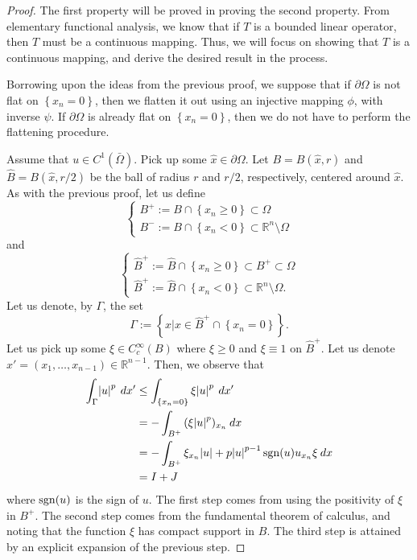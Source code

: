 \documentclass[10pt]{article}
\begin{document}
\begin{proof}
	The first property will be proved in proving the second property. From elementary functional analysis, we know that if $T$ is a bounded linear operator, then $T$ must be a continuous mapping. Thus, we will focus on showing that $T$ is a continuous mapping, and derive the desired result in the process. 
	
	Borrowing upon the ideas from the previous proof, we suppose that if $\partial \Omega$ is not flat on $\left\{ x_{n} = 0 \right\}$, then we flatten it out using an injective mapping $\phi$, with inverse $\psi$. If $\partial \Omega$ is already flat on $\left\{x_n = 0\right\}$, then we do not have to perform the flattening procedure.
	
	Assume that $u \in C^1(\bar{\Omega})$. Pick up some $\hat{x} \in \partial \Omega$. Let $B = B(\hat{x}, r)$ and $\widehat{B} = B(\hat{x},r/2)$ be the ball of radius $r$ and $r/2$, respectively, centered around $\hat{x}$. As with the previous proof, let us define 
	\begin{equation*}
		\displaystyle \begin{cases}
			B^+ := B \cap \left\{ x_n \geq 0 \right\} \subset \Omega \\
			B^- := B \cap \left\{ x_n < 0 \right\} \subset \mathbb{R}^n \setminus \Omega
		\end{cases}
	\end{equation*}
	and
	\begin{equation*}
		\displaystyle \begin{cases}
			\widehat{B}^+ := \widehat{B} \cap \left\{ x_n \geq 0 \right\} \subset B^+ \subset \Omega \\
			\widehat{B}^+ := \widehat{B} \cap \left\{ x_n < 0 \right\} \subset \mathbb{R}^n \setminus \Omega.
		\end{cases}
	\end{equation*}
	Let us denote, by $\Gamma$, the set 
	\begin{equation*}
		\displaystyle \Gamma := \left\{ x | x \in \widehat{B}^+ \cap \left\{x_n = 0\right\} \right\}.
	\end{equation*}
	Let us pick up some $\xi\in C^\infty_c(B)$ where $\xi \geq 0$ and $\xi \equiv 1$ on $\widehat{B}^+$. Let us denote $x' = (x_1,\dots,x_{n-1}) \in \mathbb{R}^{n-1}$. Then, we observe that 
	\begin{align*}
		\displaystyle \int_{\Gamma}{\abs{u}^p \: dx'} &\leq \int_{\left\{x_n=0\right\}}{\xi \abs{u}^p \: dx'} \\
		&= -\int_{B^+}{(\xi \abs{u}^p)_{x_n}\: dx} \\
	 	&= -\int_{B^+}{\xi_{x_n}\abs{u} + p\abs{u}^{p-1}\operatorname{sgn}(u)u_{x_n}\xi \: dx} \\
	 	&= I + J
	\end{align*}
	where $\operatorname{sgn}(u)$ is the sign of $u$. The first step comes from using the positivity of $\xi$ in $B^+$. The second step comes from the fundamental theorem of calculus, and noting that the function $\xi$ has compact support in $B$. The third step is attained by an explicit expansion of the previous step. 
	

\end{proof}
\end{document}
